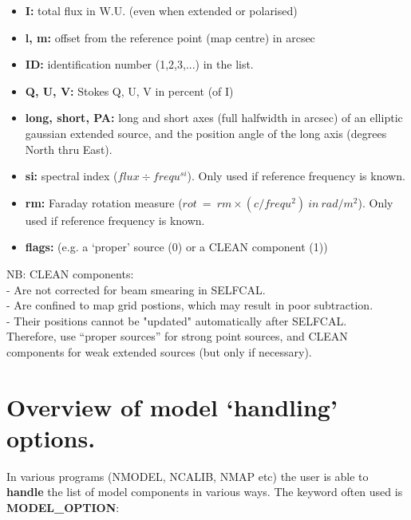 \begin{itemize}
\item {\bf I:}		
total flux in W.U. (even when extended or polarised)
\item {\bf l, m:} 	
offset from the reference point (map centre) in arcsec
\item {\bf ID:}		
identification number (1,2,3,...) in the list.
\item {\bf Q, U, V:}	
Stokes Q, U, V in percent (of I)
\item {\bf long, short, PA:} 
long and short axes (full halfwidth in arcsec) of an elliptic gaussian extended
source, and the position angle of the long axis (degrees North thru East).
\item {\bf si:}		
spectral index ($flux \div frequ^{si}$).
Only used if reference frequency is known.
\item {\bf rm:}		
Faraday rotation measure ($rot~=~ rm \times (c/frequ^{2}) ~in~rad/m^{2}$).
Only used if reference frequency is known.
\item {\bf flags:} 
(e.g. a `proper' source (0) or a CLEAN component (1)) 
\end{itemize}


NB: CLEAN components:
~\\ - Are not corrected for beam smearing in SELFCAL.
~\\ - Are confined to map grid postions, which may result in poor subtraction.
~\\ - Their positions cannot be "updated" automatically after SELFCAL.
~\\ Therefore, use ``proper sources'' for strong point sources, 
and CLEAN components for weak extended sources (but only if necessary).




\newpage
\section{Overview of model `handling' options.}
\label{mdl.descr.handle}

In various \NEWSTAR programs (NMODEL, NCALIB, NMAP etc) the user is able to 
{\bf handle} the list of model components in various ways. 
The keyword often used is {\bf MODEL\_OPTION}:


